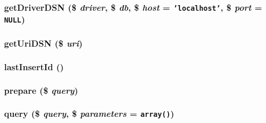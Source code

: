 \hypertarget{class_cahnory_d_b___access_0696d53fd3702f7961a382e4f5bfb4ad}{
\subsubsection[{getDriverDSN}]{\setlength{\rightskip}{0pt plus 5cm}getDriverDSN (\$ {\em driver}, \/  \$ {\em db}, \/  \$ {\em host} = {\tt 'localhost'}, \/  \$ {\em port} = {\tt NULL})}}
\label{class_cahnory_d_b___access_0696d53fd3702f7961a382e4f5bfb4ad}


\hypertarget{class_cahnory_d_b___access_bb9efc1caeba4773a942907ef4e05cf4}{
\subsubsection[{getUriDSN}]{\setlength{\rightskip}{0pt plus 5cm}getUriDSN (\$ {\em uri})}}
\label{class_cahnory_d_b___access_bb9efc1caeba4773a942907ef4e05cf4}


\hypertarget{class_cahnory_d_b___access_6384591ddfa09e979deb8a695bca0f67}{
\subsubsection[{lastInsertId}]{\setlength{\rightskip}{0pt plus 5cm}lastInsertId ()}}
\label{class_cahnory_d_b___access_6384591ddfa09e979deb8a695bca0f67}


\hypertarget{class_cahnory_d_b___access_008a39a69d47048bd395c3c63c529ed5}{
\subsubsection[{prepare}]{\setlength{\rightskip}{0pt plus 5cm}prepare (\$ {\em query})}}
\label{class_cahnory_d_b___access_008a39a69d47048bd395c3c63c529ed5}


\hypertarget{class_cahnory_d_b___access_b696bd79e1b13e1310ed2d65da4f2658}{
\subsubsection[{query}]{\setlength{\rightskip}{0pt plus 5cm}query (\$ {\em query}, \/  \$ {\em parameters} = {\tt array()})}}
\label{class_cahnory_d_b___access_b696bd79e1b13e1310ed2d65da4f2658}


